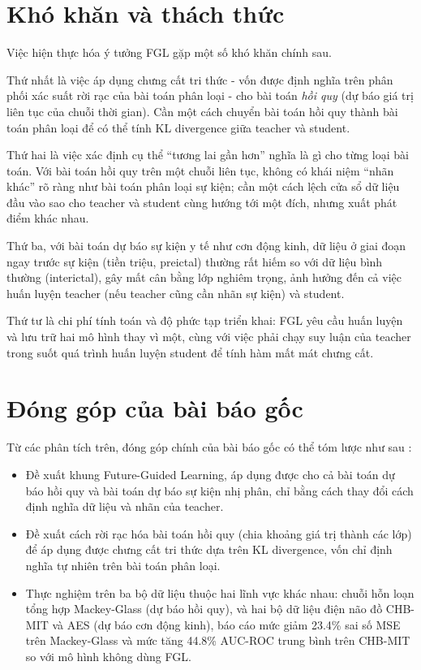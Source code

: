 \section{Khó khăn và thách thức}

Việc hiện thực hóa ý tưởng FGL gặp một số khó khăn chính sau.

Thứ nhất là việc áp dụng chưng cất tri thức - vốn được định nghĩa trên phân phối xác suất
rời rạc của bài toán phân loại \cite{hinton2015distillation} - cho bài toán \textit{hồi quy}
(dự báo giá trị liên tục của chuỗi thời gian). Cần một cách chuyển bài toán hồi quy thành bài
toán phân loại để có thể tính KL divergence giữa teacher và student.

Thứ hai là việc xác định cụ thể ``tương lai gần hơn'' nghĩa là gì cho từng loại bài toán. Với
bài toán hồi quy trên một chuỗi liên tục, không có khái niệm ``nhãn khác'' rõ ràng như bài toán
phân loại sự kiện; cần một cách lệch cửa sổ dữ liệu đầu vào sao cho teacher và student cùng
hướng tới một đích, nhưng xuất phát điểm khác nhau.

Thứ ba, với bài toán dự báo sự kiện y tế như cơn động kinh, dữ liệu ở giai đoạn ngay trước sự
kiện (tiền triệu, preictal) thường rất hiếm so với dữ liệu bình thường (interictal), gây mất
cân bằng lớp nghiêm trọng, ảnh hưởng đến cả việc huấn luyện teacher (nếu teacher cũng cần nhãn
sự kiện) và student.

Thứ tư là chi phí tính toán và độ phức tạp triển khai: FGL yêu cầu huấn luyện và lưu trữ hai
mô hình thay vì một, cùng với việc phải chạy suy luận của teacher trong suốt quá trình huấn
luyện student để tính hàm mất mát chưng cất.

\section{Đóng góp của bài báo gốc}

Từ các phân tích trên, đóng góp chính của bài báo gốc có thể tóm lược như sau
\cite{gunasekaran2025fgl}:
\begin{itemize}
	\item Đề xuất khung Future-Guided Learning, áp dụng được cho cả bài toán dự báo hồi quy và
	bài toán dự báo sự kiện nhị phân, chỉ bằng cách thay đổi cách định nghĩa dữ liệu và nhãn
	của teacher.
	\item Đề xuất cách rời rạc hóa bài toán hồi quy (chia khoảng giá trị thành các lớp) để áp
	dụng được chưng cất tri thức dựa trên KL divergence, vốn chỉ định nghĩa tự nhiên trên bài
	toán phân loại.
	\item Thực nghiệm trên ba bộ dữ liệu thuộc hai lĩnh vực khác nhau: chuỗi hỗn loạn tổng hợp
	Mackey-Glass (dự báo hồi quy), và hai bộ dữ liệu điện não đồ CHB-MIT và AES (dự báo cơn
	động kinh), báo cáo mức giảm 23.4\% sai số MSE trên Mackey-Glass và mức tăng 44.8\% AUC-ROC
	trung bình trên CHB-MIT so với mô hình không dùng FGL.
\end{itemize}
